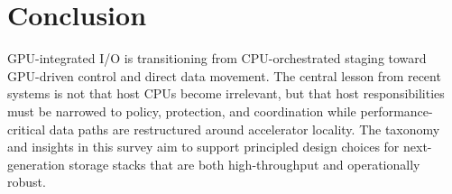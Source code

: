 \section{Conclusion}

GPU-integrated I/O is transitioning from CPU-orchestrated staging toward GPU-driven control and direct data movement. The central lesson from recent systems is not that host CPUs become irrelevant, but that host responsibilities must be narrowed to policy, protection, and coordination while performance-critical data paths are restructured around accelerator locality. The taxonomy and insights in this survey aim to support principled design choices for next-generation storage stacks that are both high-throughput and operationally robust.
